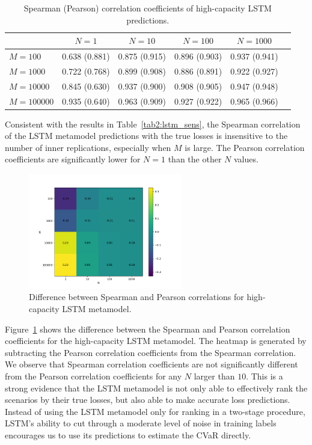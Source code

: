 \begin{table}[ht!]
    \small
    \centering
    \begin{tabular}{lccccc}
        \toprule
                          & $N=1$        & $N=10$        & $N=100$       & $N=\num{1000}$ \\
        \midrule
        $M = 100$         & 0.638 (0.881) & 0.875 (0.915) & 0.896 (0.903) & 0.937 (0.941) \\
        $M = \num{1000}$   & 0.722 (0.768) & 0.899 (0.908) & 0.886 (0.891) & 0.922 (0.927) \\
        $M = \num{10000}$  & 0.845 (0.630) & 0.937 (0.900) & 0.908 (0.905) & 0.947 (0.948) \\
        $M = \num{100000}$ & 0.935 (0.640) & 0.963 (0.909) & 0.927 (0.922) & 0.965 (0.966) \\
        \bottomrule
    \end{tabular}
    \caption{Spearman (Pearson) correlation coefficients of high-capacity LSTM predictions.}
    \label{tab2:lstm_corr}
\end{table}

Consistent with the results in Table~\ref{tab2:lstm_sens}, the Spearman correlation of the LSTM metamodel predictions with the true losses is insensitive to the number of inner replications, especially when $M$ is large.
The Pearson correlation coefficients are significantly lower for $N=1$ than the other $N$ values.

\begin{figure}
    \centering
    \includegraphics[width=0.6\textwidth]{./project2/figures/cor_heatmap.png}
    \caption{Difference between Spearman and Pearson correlations for high-capacity LSTM metamodel.}
    \label{fig2:cor-heatmap}
\end{figure}

Figure~\ref{fig2:cor-heatmap} shows the difference between the Spearman and Pearson correlation coefficients for the high-capacity LSTM metamodel.
The heatmap is generated by subtracting the Pearson correlation coefficients from the Spearman correlation.
We observe that Spearman correlation coefficients are not significantly different from the Pearson correlation coefficients for any $N$ larger than $10$. 
This is a strong evidence that the LSTM metamodel is not only able to effectively rank the scenarios by their true losses, but also able to make accurate loss predictions.
Instead of using the LSTM metamodel only for ranking in a two-stage procedure, LSTM's ability to cut through a moderate level of noise in training labels encourages us to use its predictions to estimate the CVaR directly. 

